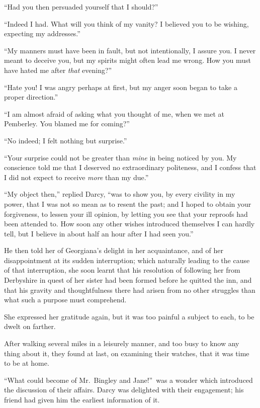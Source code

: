 \documentclass[12pt,english,oneside]{book}
\begin{document}
{}``Had you then persuaded yourself that I should?''\ 

{}``Indeed I had. What will you think of my vanity? I believed you
to be wishing, expecting my addresses.''

{}``My manners must have been in fault, but not intentionally, I
assure you. I never meant to deceive you, but my spirits might often
lead me wrong. How you must have hated me after \textit{that} evening?''\ 

{}``Hate you! I was angry perhaps at first, but my anger soon began
to take a proper direction.''

{}``I am almost afraid of asking what you thought of me, when we
met at Pemberley. You blamed me for coming?''\ 

{}``No indeed; I felt nothing but surprise.''

{}``Your surprise could not be greater than \textit{mine} in being
noticed by you. My conscience told me that I deserved no extraordinary
politeness, and I confess that I did not expect to receive \textit{more}
than my due.''

{}``My object then,'' replied Darcy, {}``was to show you, by every
civility in my power, that I was not so mean as to resent the past;
and I hoped to obtain your forgiveness, to lessen your ill opinion,
by letting you see that your reproofs had been attended to. How soon
any other wishes introduced themselves I can hardly tell, but I believe
in about half an hour after I had seen you.''

He then told her of Georgiana's delight in her acquaintance, and of
her disappointment at its sudden interruption; which naturally leading
to the cause of that interruption, she soon learnt that his resolution
of following her from Derbyshire in quest of her sister had been formed
before he quitted the inn, and that his gravity and thoughtfulness
there had arisen from no other struggles than what such a purpose
must comprehend.

She expressed her gratitude again, but it was too painful a subject
to each, to be dwelt on farther.

After walking several miles in a leisurely manner, and too busy to
know any thing about it, they found at last, on examining their watches,
that it was time to be at home.

{}``What could become of Mr.\ Bingley and Jane!''\ was a wonder
which introduced the discussion of their affairs. Darcy was delighted
with their engagement; his friend had given him the earliest information
of it.
\end{document}
